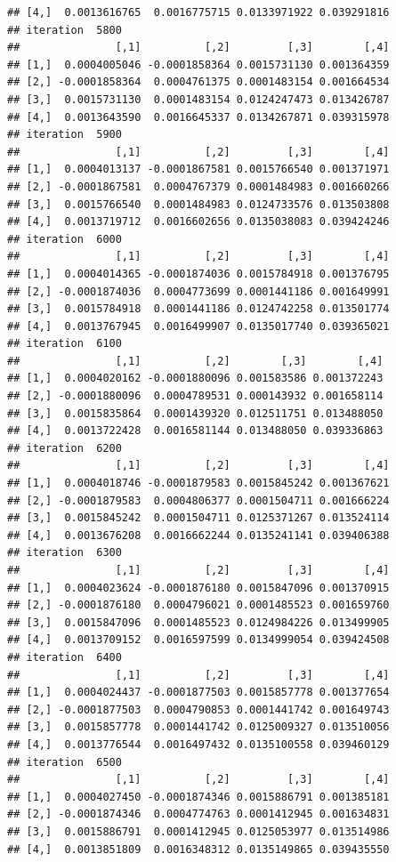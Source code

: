 \documentclass[
]{article}
\begin{document}
\begin{verbatim}
## [4,]  0.0013616765  0.0016775715 0.0133971922 0.039291816
## iteration  5800 
##               [,1]          [,2]         [,3]        [,4]
## [1,]  0.0004005046 -0.0001858364 0.0015731130 0.001364359
## [2,] -0.0001858364  0.0004761375 0.0001483154 0.001664534
## [3,]  0.0015731130  0.0001483154 0.0124247473 0.013426787
## [4,]  0.0013643590  0.0016645337 0.0134267871 0.039315978
## iteration  5900 
##               [,1]          [,2]         [,3]        [,4]
## [1,]  0.0004013137 -0.0001867581 0.0015766540 0.001371971
## [2,] -0.0001867581  0.0004767379 0.0001484983 0.001660266
## [3,]  0.0015766540  0.0001484983 0.0124733576 0.013503808
## [4,]  0.0013719712  0.0016602656 0.0135038083 0.039424246
## iteration  6000 
##               [,1]          [,2]         [,3]        [,4]
## [1,]  0.0004014365 -0.0001874036 0.0015784918 0.001376795
## [2,] -0.0001874036  0.0004773699 0.0001441186 0.001649991
## [3,]  0.0015784918  0.0001441186 0.0124742258 0.013501774
## [4,]  0.0013767945  0.0016499907 0.0135017740 0.039365021
## iteration  6100 
##               [,1]          [,2]        [,3]        [,4]
## [1,]  0.0004020162 -0.0001880096 0.001583586 0.001372243
## [2,] -0.0001880096  0.0004789531 0.000143932 0.001658114
## [3,]  0.0015835864  0.0001439320 0.012511751 0.013488050
## [4,]  0.0013722428  0.0016581144 0.013488050 0.039336863
## iteration  6200 
##               [,1]          [,2]         [,3]        [,4]
## [1,]  0.0004018746 -0.0001879583 0.0015845242 0.001367621
## [2,] -0.0001879583  0.0004806377 0.0001504711 0.001666224
## [3,]  0.0015845242  0.0001504711 0.0125371267 0.013524114
## [4,]  0.0013676208  0.0016662244 0.0135241141 0.039406388
## iteration  6300 
##               [,1]          [,2]         [,3]        [,4]
## [1,]  0.0004023624 -0.0001876180 0.0015847096 0.001370915
## [2,] -0.0001876180  0.0004796021 0.0001485523 0.001659760
## [3,]  0.0015847096  0.0001485523 0.0124984226 0.013499905
## [4,]  0.0013709152  0.0016597599 0.0134999054 0.039424508
## iteration  6400 
##               [,1]          [,2]         [,3]        [,4]
## [1,]  0.0004024437 -0.0001877503 0.0015857778 0.001377654
## [2,] -0.0001877503  0.0004790853 0.0001441742 0.001649743
## [3,]  0.0015857778  0.0001441742 0.0125009327 0.013510056
## [4,]  0.0013776544  0.0016497432 0.0135100558 0.039460129
## iteration  6500 
##               [,1]          [,2]         [,3]        [,4]
## [1,]  0.0004027450 -0.0001874346 0.0015886791 0.001385181
## [2,] -0.0001874346  0.0004774763 0.0001412945 0.001634831
## [3,]  0.0015886791  0.0001412945 0.0125053977 0.013514986
## [4,]  0.0013851809  0.0016348312 0.0135149865 0.039435550

\end{verbatim}
\end{document}
